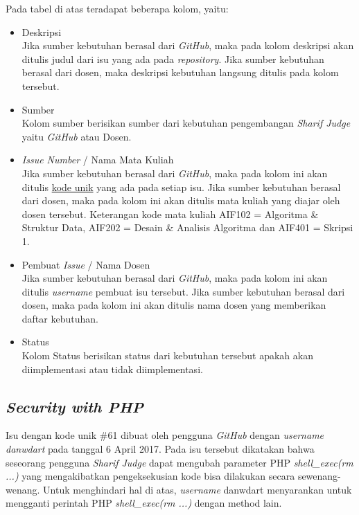Pada tabel di atas teradapat beberapa kolom, yaitu:
\begin{itemize}
	\item Deskripsi \\
	Jika sumber kebutuhan berasal dari \textit{GitHub}, maka pada kolom deskripsi akan ditulis judul dari isu yang ada pada \textit{repository}. Jika sumber kebutuhan berasal dari dosen, maka deskripsi kebutuhan langsung ditulis pada kolom tersebut.
	\item Sumber \\
	Kolom sumber berisikan sumber dari kebutuhan pengembangan \textit{Sharif Judge} yaitu \textit{GitHub} atau Dosen.
	\item \textit{Issue Number} / Nama Mata Kuliah \\
	Jika sumber kebutuhan berasal dari \textit{GitHub}, maka pada kolom ini akan ditulis \hyperref[sec:analisis]{kode unik} yang ada pada setiap isu. Jika sumber kebutuhan berasal dari dosen, maka pada kolom ini akan ditulis mata kuliah yang diajar oleh dosen tersebut. Keterangan kode mata kuliah AIF102 = Algoritma \& Struktur Data, AIF202 = Desain \& Analisis Algoritma dan AIF401 = Skripsi 1.
	\item Pembuat \textit{Issue} / Nama Dosen \\
	Jika sumber kebutuhan berasal dari \textit{GitHub}, maka pada kolom ini akan ditulis \textit{username} pembuat isu tersebut. Jika sumber kebutuhan berasal dari dosen, maka pada kolom ini akan ditulis nama dosen yang memberikan daftar kebutuhan.
	\item Status \\
	Kolom Status berisikan status dari kebutuhan tersebut apakah akan diimplementasi atau tidak diimplementasi.
\end{itemize}


\subsection{\textit{Security with PHP}}
Isu dengan kode unik \#61 dibuat oleh pengguna \textit{GitHub} dengan \textit{username} \textit{danwdart} pada tanggal 6 April 2017. Pada isu tersebut dikatakan bahwa seseorang pengguna \textit{Sharif Judge} dapat mengubah parameter PHP \textit{shell\_exec(rm ...)} yang mengakibatkan pengeksekusian kode bisa dilakukan secara sewenang-wenang. Untuk menghindari hal di atas, \textit{username} danwdart menyarankan untuk mengganti perintah PHP \textit{shell\_exec(rm ...)} dengan method lain.

